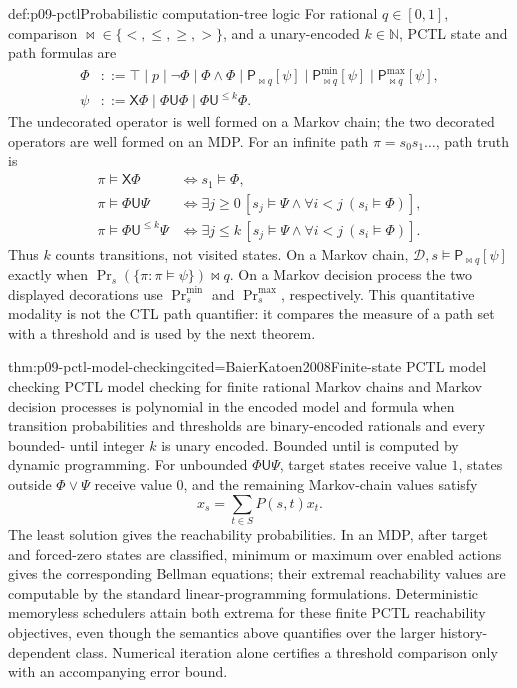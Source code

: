 \begin{hbdefinition}{def:p09-pctl}{Probabilistic computation-tree logic}
For rational \(q\in[0,1]\), comparison
\(\bowtie\in\{<,\leq,\geq,>\}\), and a unary-encoded
\(k\in\mathbb N\), PCTL state and path formulas are
\[
\begin{aligned}
 \Phi&::=\top\mid p\mid\neg\Phi\mid\Phi\land\Phi
       \mid\mathsf P_{\bowtie q}[\psi]
       \mid\mathsf P^{\min}_{\bowtie q}[\psi]
       \mid\mathsf P^{\max}_{\bowtie q}[\psi],\\
 \psi&::=\mathsf X\Phi\mid\Phi\mathbin{\mathsf U}\Phi
       \mid\Phi\mathbin{\mathsf U^{\leq k}}\Phi.
\end{aligned}
\]
The undecorated operator is well formed on a Markov chain; the two decorated
operators are well formed on an MDP.  For an infinite path
\(\pi=s_0s_1\ldots\), path truth is
\[
\begin{aligned}
 \pi\models\mathsf X\Phi
 &\Longleftrightarrow s_1\models\Phi,\\
 \pi\models\Phi\mathbin{\mathsf U}\Psi
 &\Longleftrightarrow
   \exists j\geq0\,[s_j\models\Psi\land
     \forall i<j\ (s_i\models\Phi)],\\
 \pi\models\Phi\mathbin{\mathsf U^{\leq k}}\Psi
 &\Longleftrightarrow
   \exists j\leq k\,[s_j\models\Psi\land
     \forall i<j\ (s_i\models\Phi)].
\end{aligned}
\]
Thus \(k\) counts transitions, not visited states.  On a Markov chain,
\(\mathcal D,s\models\mathsf P_{\bowtie q}[\psi]\) exactly when
\(\Pr_s(\{\pi:\pi\models\psi\})\bowtie q\).  On a Markov decision process the
two displayed decorations use \(\Pr_s^{\min}\) and \(\Pr_s^{\max}\),
respectively.  This quantitative modality is not the CTL path quantifier: it
compares the measure of a path set with a threshold and is used by the next
theorem.
\end{hbdefinition}

\begin{hbtheorem}{thm:p09-pctl-model-checking}{cited=BaierKatoen2008}{Finite-state PCTL model checking}
PCTL model checking for finite rational Markov chains and Markov decision
processes is polynomial in the encoded model and formula when transition
probabilities and thresholds are binary-encoded rationals and every bounded-
until integer \(k\) is unary encoded.  Bounded until is computed by dynamic
programming.  For unbounded
\(\Phi\mathbin{\mathsf U}\Psi\), target states receive value \(1\), states
outside \(\Phi\lor\Psi\) receive value \(0\), and the remaining Markov-chain
values satisfy
\[
 x_s=\sum_{t\in S}P(s,t)x_t.
\]
The least solution gives the reachability probabilities.  In an MDP, after
target and forced-zero states are classified, minimum or maximum over enabled
actions gives the corresponding Bellman equations; their extremal reachability
values are computable by the standard linear-programming formulations.
Deterministic memoryless schedulers attain both extrema for these finite PCTL
reachability objectives, even though the semantics above quantifies over the
larger history-dependent class.
Numerical iteration alone certifies a threshold comparison only with an
accompanying error bound.
\end{hbtheorem}

